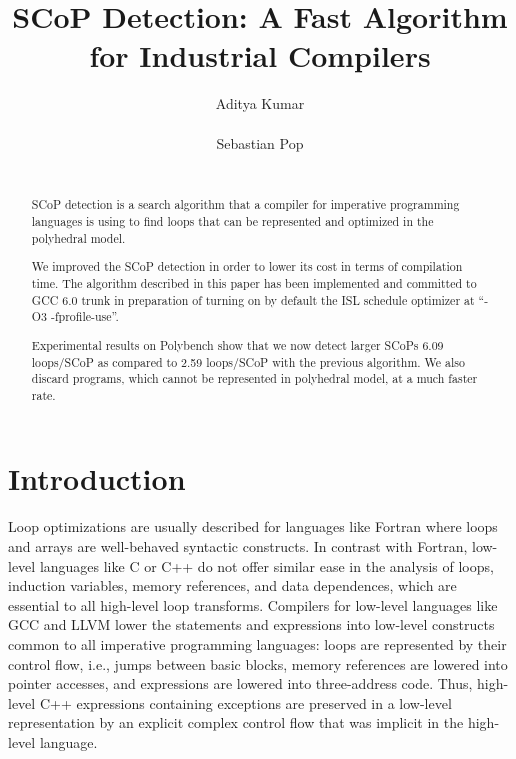 \documentclass{sig-alternate}
\begin{document}
\setlength{\pdfpageheight}{\paperheight}
\setlength{\pdfpagewidth}{\paperwidth}

\title{SCoP Detection: A Fast Algorithm for Industrial Compilers}


\author{
\alignauthor
Aditya Kumar\\
       \\
\alignauthor
Sebastian Pop\\
       \\
}

\maketitle

\begin{abstract}
SCoP detection is a search algorithm that a compiler for imperative programming
languages is using to find loops that can be represented and optimized in the
polyhedral model.

We improved the SCoP detection in order to lower its cost in terms of compilation time.
The algorithm described in this paper has been implemented and committed
to GCC 6.0 trunk in preparation of turning on by default the ISL schedule
optimizer at ``-O3 -fprofile-use''.

Experimental results on Polybench show that we now detect larger SCoPs 6.09 loops/SCoP
as compared to 2.59 loops/SCoP with the previous algorithm. We also discard programs,
which cannot be represented in polyhedral model, at a much faster rate.
\end{abstract}

\section{Introduction}

Loop optimizations are usually described for languages like Fortran where loops
and arrays are well-behaved syntactic constructs.  In contrast with Fortran,
low-level languages like C or C++ do not offer similar ease in the analysis of
loops, induction variables, memory references, and data dependences, which are
essential to all high-level loop transforms.  Compilers for low-level languages
like GCC and LLVM lower the statements and expressions into low-level constructs
common to all imperative programming languages: loops are represented by their
control flow, i.e., jumps between basic blocks, memory references are lowered
into pointer accesses, and expressions are lowered into three-address code.
Thus, high-level C++ expressions containing exceptions are preserved in a
low-level representation by an explicit complex control flow that was implicit
in the high-level language.
\end{document}
